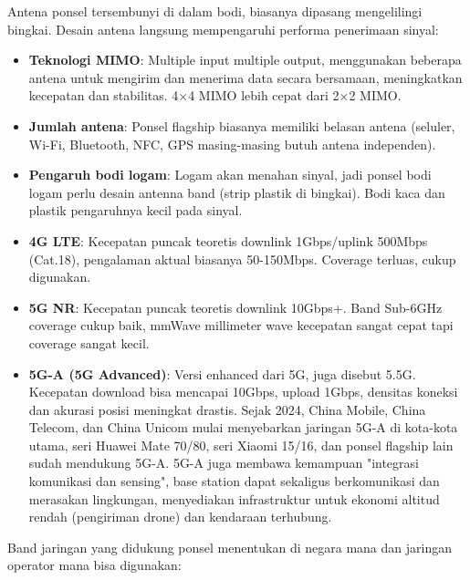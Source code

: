 
Antena ponsel tersembunyi di dalam bodi, biasanya dipasang mengelilingi bingkai. Desain antena langsung mempengaruhi performa penerimaan sinyal:

\begin{itemize}
  \item \textbf{Teknologi MIMO}: Multiple input multiple output, menggunakan beberapa antena untuk mengirim dan menerima data secara bersamaan, meningkatkan kecepatan dan stabilitas. 4×4 MIMO lebih cepat dari 2×2 MIMO.
  \item \textbf{Jumlah antena}: Ponsel flagship biasanya memiliki belasan antena (seluler, Wi-Fi, Bluetooth, NFC, GPS masing-masing butuh antena independen).
  \item \textbf{Pengaruh bodi logam}: Logam akan menahan sinyal, jadi ponsel bodi logam perlu desain antenna band (strip plastik di bingkai). Bodi kaca dan plastik pengaruhnya kecil pada sinyal.
\end{itemize}


\begin{itemize}
  \item \textbf{4G LTE}: Kecepatan puncak teoretis downlink 1Gbps/uplink 500Mbps (Cat.18), pengalaman aktual biasanya 50-150Mbps. Coverage terluas, cukup digunakan.
  \item \textbf{5G NR}: Kecepatan puncak teoretis downlink 10Gbps+. Band Sub-6GHz coverage cukup baik, mmWave millimeter wave kecepatan sangat cepat tapi coverage sangat kecil.
  \item \textbf{5G-A (5G Advanced)}: Versi enhanced dari 5G, juga disebut 5.5G. Kecepatan download bisa mencapai 10Gbps, upload 1Gbps, densitas koneksi dan akurasi posisi meningkat drastis. Sejak 2024, China Mobile, China Telecom, dan China Unicom mulai menyebarkan jaringan 5G-A di kota-kota utama, seri Huawei Mate 70/80, seri Xiaomi 15/16, dan ponsel flagship lain sudah mendukung 5G-A. 5G-A juga membawa kemampuan "integrasi komunikasi dan sensing", base station dapat sekaligus berkomunikasi dan merasakan lingkungan, menyediakan infrastruktur untuk ekonomi altitud rendah (pengiriman drone) dan kendaraan terhubung.
\end{itemize}


Band jaringan yang didukung ponsel menentukan di negara mana dan jaringan operator mana bisa digunakan:

